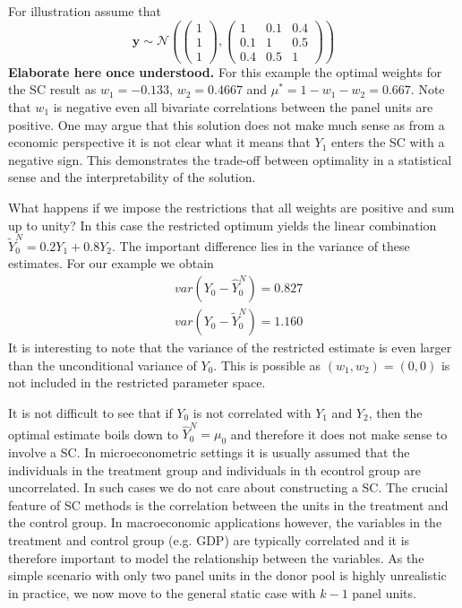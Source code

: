 For illustration assume that
\[
\boldsymbol{y} \sim \mathcal{N}\left( 
\begin{pmatrix} 1\\ 1\\ 1 \end{pmatrix}, 
\begin{pmatrix} 1 &0.1 &0.4\\0.1 &1 &0.5\\0.4 &0.5 &1 \end{pmatrix}\right) 
\] 
\textbf{Elaborate here once understood.} For this  example the optimal weights for the \ac{SC} result as $w_1 = -0.133$, $w_2 = 0.4667$ and $\mu^* = 1 - w_1 - w_2 = 0.667$. Note that $w_1$ is negative even all bivariate correlations between the panel units are positive. One may argue that this solution does not make much sense as from a economic perspective it is not clear what  it means that $Y_1$ enters the \ac{SC} with a negative sign. This demonstrates the trade-off between optimality in a statistical sense and the interpretability of the solution.

What happens if we impose the restrictions that all weights are positive and sum up to unity? In this case the restricted optimum yields the linear combination $\widetilde{Y}^{N}_{0} = 0.2 Y_1 + 0.8 Y_2$. The important difference lies in the variance of these estimates. For our example we obtain
\begin{equation*}
	\begin{split}
		& var(Y_0 - \widehat{Y}^{N}_{0}) = 0.827 \\
		& var(Y_0 - \widetilde{Y}^{N}_{0}) = 1.160		
	\end{split}
\end{equation*}
It is interesting to note that the variance of the restricted estimate is even larger than the unconditional variance of $Y_0$. This is possible as $(w_1, w_2) = (0,0)$ is not included in the restricted parameter space. 

It is not difficult to see that if $Y_0$ is not correlated with $Y_1$ and $Y_2$, then the optimal estimate boils down to $\widehat{Y}^{N}_{0} = \mu_0$ and therefore it does not make sense to involve a \ac{SC}. In microeconometric settings it is usually assumed that the individuals in the treatment group and individuals in th econtrol group are uncorrelated. In such cases we do not care about constructing a \ac{SC}. The crucial feature of \ac{SC} methods is the correlation between the units in the treatment and the control group. In macroeconomic applications however, the variables in the treatment and control group (e.g. \ac{GDP}) are typically correlated and it is therefore important to model the relationship between the variables. As the simple scenario with only two panel units in the donor pool is highly unrealistic in practice, we now move to the general static case with $k-1$ panel units.
